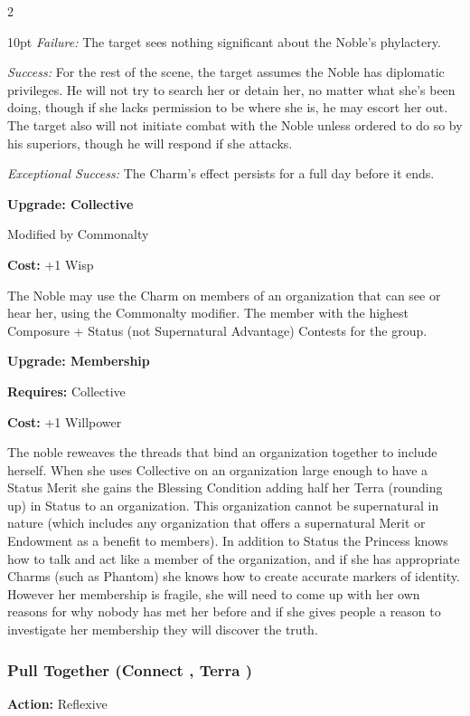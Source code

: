 \begin{multicols}{2}
\begin{myindentpar}{10pt}
    \emph{Failure:} The target sees nothing significant about the Noble’s phylactery.

    \emph{Success:}  For the rest of the scene, the target assumes the Noble has diplomatic privileges. He will not try to search her or detain her, no matter what she’s been doing, though if she lacks permission to be where she is, he may escort her out. The target also will not initiate combat with the Noble unless ordered to do so by his superiors, though he will respond if she attacks.

    \emph{Exceptional Success:}  The Charm’s effect persists for a full day before it ends.
	
	\textbf{Upgrade: Collective}

	Modified by Commonalty

	\textbf{Cost:} +1 Wisp

	The Noble may use the Charm on members of an organization that can see or hear her, using the Commonalty modifier. The member with the highest Composure + Status (not Supernatural Advantage) Contests for the group.
	
	\textbf{Upgrade: Membership}
	
	\textbf{Requires:} Collective
	
	\textbf{Cost:} +1 Willpower
	
	The noble reweaves the threads that bind an organization together to include herself. When she uses Collective on an organization large enough to have a Status Merit she gains the Blessing Condition adding half her Terra (rounding up) in Status to an organization. This organization cannot be supernatural in nature (which includes any organization that offers a supernatural Merit or Endowment as a benefit to members). In addition to Status the Princess knows how to talk and act like a member of the organization, and if she has appropriate Charms (such as Phantom) she knows how to create accurate markers of identity. However her membership is fragile, she will need to come up with her own reasons for why nobody has met her before and if she gives people a reason to investigate her membership they will discover the truth. 
	\end{myindentpar}
	
\subsubsection*{Pull Together (Connect \textbullet, Terra \textbullet\textbullet)}

\noindent \textbf{Action:} Reflexive


\end{multicols}
